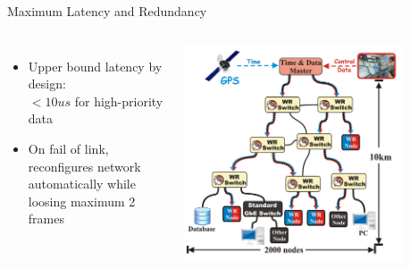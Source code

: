 \documentclass[compress,red]{beamer}
\begin{document}
\begin{frame}{Maximum Latency and Redundancy}

\begin{columns}[c]

      \begin{itemize}
	      \item Upper bound latency by design: \\ $<10us$ for high-priority data
	      \item On fail of link, reconfigures network automatically while loosing maximum 2 frames
      \end{itemize}
% 
    \begin{center}
    \includegraphics[width=0.8\textwidth]{network/wr_network-enhanced_pro.pdf}
    \end{center}
\end{columns}
\end{frame}
\end{document}
